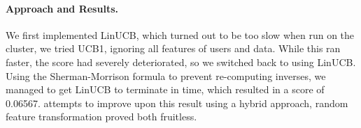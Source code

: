 \documentclass[a4paper, 11pt]{article}
\begin{document}

\paragraph{Approach and Results.\!\!\!}


We first implemented LinUCB, which turned out to be too slow when run on the cluster, we tried UCB1, ignoring all features of users and data. While this ran faster, the score had severely deteriorated, so we switched back to using LinUCB. Using the Sherman-Morrison formula to prevent re-computing inverses, we managed to get LinUCB to terminate in time, which resulted in a score of 0.06567. attempts to improve upon this result using a hybrid approach, random feature transformation proved both fruitless. 






\end{document}
